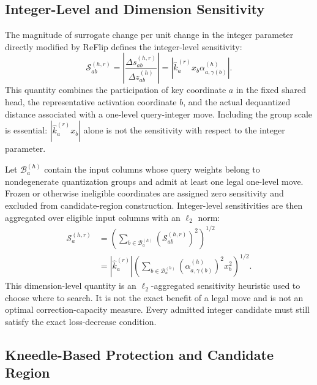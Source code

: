 \subsection{Integer-Level and Dimension Sensitivity}

The magnitude of surrogate change per unit change in the integer parameter directly modified by ReFlip defines the integer-level sensitivity:
\begin{equation}
\mathcal{S}^{(h,r)}_{ab}
=
\left|
\frac{\Delta s^{(h,r)}_{ab}}
{\Delta z^{(h)}_{ab}}
\right|
=
\left|
\hat k^{(r)}_a x_b
\alpha^{(h)}_{a,\gamma(b)}
\right|.
\end{equation}
This quantity combines the participation of key coordinate $a$ in the fixed shared head, the representative activation coordinate $b$, and the actual dequantized distance associated with a one-level query-integer move. Including the group scale is essential: $|\hat k^{(r)}_a x_b|$ alone is not the sensitivity with respect to the integer parameter.

Let $\mathcal{B}^{(h)}_a$ contain the input columns whose query weights belong to nondegenerate quantization groups and admit at least one legal one-level move. Frozen or otherwise ineligible coordinates are assigned zero sensitivity and excluded from candidate-region construction. Integer-level sensitivities are then aggregated over eligible input columns with an $\ell_2$ norm:
\begin{align}
\mathcal{S}^{(h,r)}_a
&=
\left(
\sum_{b\in\mathcal{B}^{(h)}_a}
\left(\mathcal{S}^{(h,r)}_{ab}\right)^2
\right)^{1/2} \\
&=
\left|\hat k^{(r)}_a\right|
\left(
\sum_{b\in\mathcal{B}^{(h)}_a}
\left(\alpha^{(h)}_{a,\gamma(b)}\right)^2x_b^2
\right)^{1/2}.
\end{align}
This dimension-level quantity is an $\ell_2$-aggregated sensitivity heuristic used to choose where to search. It is not the exact benefit of a legal move and is not an optimal correction-capacity measure. Every admitted integer candidate must still satisfy the exact loss-decrease condition.

\subsection{Kneedle-Based Protection and Candidate Region}

